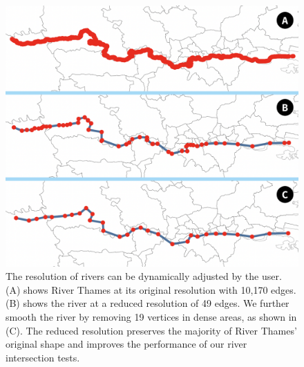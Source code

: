  {
  \begin{figure}[tb!]
      \centering
      \includegraphics[width=0.7\columnwidth,keepaspectratio]{figure/river_resolution.png}
      \caption{The resolution of rivers can be dynamically adjusted by the user. (A) shows River Thames at its original resolution with 10,170 edges. (B) shows the river at a reduced resolution of 49 edges. We further smooth the river by removing 19 vertices in dense areas, as shown in (C). The reduced resolution preserves the majority of River Thames' original shape and improves the performance of our river intersection tests.}
      \label{fig:river resolution}
  \end{figure}
 }



